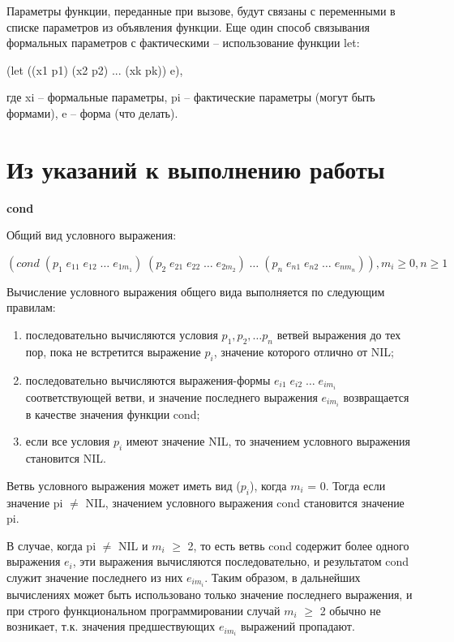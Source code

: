 \documentclass[12pt]{report}
\begin{document}
Параметры функции, переданные при вызове, будут связаны с переменными в списке параметров из объявления функции. Еще один способ связывания формальных параметров с фактическими -- использование функции let:

(let ((x1 p1) (x2 p2) ... (xk pk))  e),

где xi -- формальные параметры, pi -- фактические параметры (могут быть формами), e -- форма (что делать).

\section*{Из указаний к выполнению работы}

\textbf{cond}

Общий вид условного выражения:

$(cond \; (p_1  \; e_{11}  \;  e_{12}  \;  …  \;  e_{1m_1})  \;  (p_2  \;  e_{21} \;  e_{22}  \;  …  \;  e_{2m_2})  \;  …  \;  (p_n  \; e_{n1} \;  e_{n2} \;  …  \; e_{nm_n})), m_i \geqslant 0 , n \geqslant 1$

Вычисление условного выражения общего вида выполняется по  следующим правилам:

\begin{enumerate}
	\item последовательно вычисляются условия $p_1, p_2, … p_n$ ветвей выражения до тех пор, пока не встретится выражение $p_i$, значение   которого отлично от NIL;
	\item последовательно вычисляются выражения-формы $e_{i1} \;  e_{i2} \;  … \;  e_{im_i}$ соответствующей ветви, и значение последнего выражения $e_{im_i}$ возвращается в качестве значения функции cond;
	\item если все условия $p_i$ имеют значение NIL, то значением условного выражения становится NIL.
\end{enumerate}

Ветвь условного выражения может иметь вид ($p_i$), когда $m_i$ = 0. Тогда если значение pi $\neq$ NIL, значением условного выражения cond становится значение pi.

В случае, когда pi $\neq$ NIL и $m_i$ $\geqslant$ 2, то есть ветвь cond содержит более  одного выражения $e_i$, эти выражения вычисляются последовательно, и  результатом cond служит значение последнего из них $e_{im_i}$. Таким  образом, в дальнейших вычислениях может быть использовано только значение последнего выражения, и при строго функциональном  программировании случай $m_i$ $\geqslant$ 2 обычно не возникает, т.к. значения  предшествующих $e_{im_i}$ выражений пропадают. 
\end{document}
